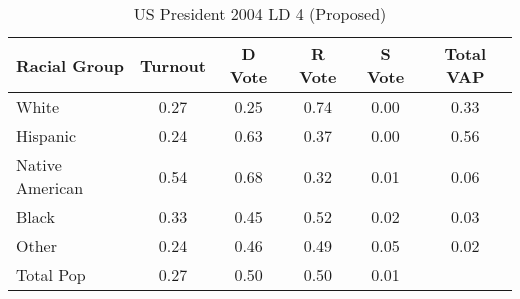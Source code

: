 \begin{table}[htb]
\begin{center}
\caption{US President 2004 LD 4 (Proposed)}
\label{pres04_vap_ld_4}
\begin{tabular}{lccccc}
  \hline
Racial Group & Turnout & D Vote & R Vote & S Vote & Total VAP \\ 
  \hline
White & 0.27 & 0.25 & 0.74 & 0.00 & 0.33 \\ 
  Hispanic & 0.24 & 0.63 & 0.37 & 0.00 & 0.56 \\ 
  Native American & 0.54 & 0.68 & 0.32 & 0.01 & 0.06 \\ 
  Black & 0.33 & 0.45 & 0.52 & 0.02 & 0.03 \\ 
  Other & 0.24 & 0.46 & 0.49 & 0.05 & 0.02 \\ 
  Total Pop & 0.27 & 0.50 & 0.50 & 0.01 &  \\ 
   \hline
\end{tabular}
\end{center}
\end{table}
